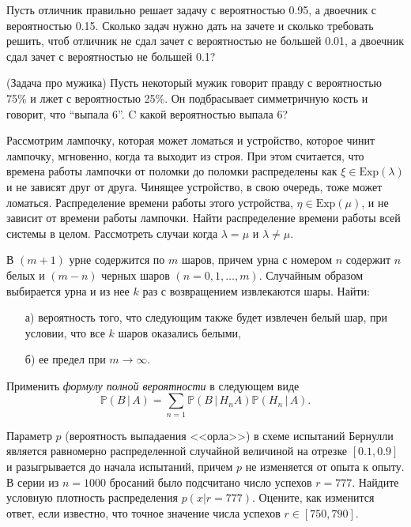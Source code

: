 \begin{problem}
Пусть отличник правильно решает задачу с вероятностью 0.95, а двоечник с вероятностью 0.15. Сколько задач нужно дать на зачете и сколько требовать решить, чтоб отличник не сдал зачет с вероятностью не большей 0.01, а двоечник сдал зачет с вероятностью не большей 0.1?
\end{problem}


\begin{problem}(Задача про мужика)
Пусть некоторый мужик говорит правду с вероятностью 75\% и лжет с 
вероятностью 25\%. Он подбрасывает симметричную кость и говорит, 
что ``выпала 6''. C какой вероятностью выпала 6?
\end{problem}

\begin{problem}
Рассмотрим лампочку, которая может ломаться и устройство, которое чинит лампочку, мгновенно, когда та выходит из строя. При этом считается, что времена работы лампочки от поломки до поломки распределены как $\xi \in \text{Exp}(\lambda)$ и не зависят друг от друга. Чинящее устройство, в свою очередь, тоже может ломаться. Распределение времени работы этого устройства, $\eta \in \text{Exp}(\mu)$, и не зависит от времени работы лампочки. Найти распределение времени работы всей системы в целом. Рассмотреть случаи когда $\lambda = \mu$ и $\lambda \neq \mu$.
\end{problem}



\begin{problem}
В $(m+1)$ урне содержится по $m$ шаров, причем урна с номером $n$ содержит $n$ белых и $(m-n)$ черных шаров $(n = 0,1,\ldots,m)$. 
Случайным образом выбирается урна и из нее $k$ раз с возвращением извлекаются шары. Найти: 
\begin{enumerate}
\item[а)] вероятность того, что следующим также будет извлечен белый шар, при условии, что все $k$ шаров оказались белыми, 
\item[б)] ее предел при $m\to\infty$. 
\end{enumerate}
\end{problem}

\begin{ordre}
Применить \textit{формулу полной вероятности} в следующем виде 
$$
{\mathbb P}(B\, |\, A)=\sum\limits_{n=1} {\mathbb P}(B\, |\, H_n A){\mathbb P}(H_n\, |\, A).
$$
\end{ordre}


\begin{problem}
Параметр $p$ (вероятность выпадаения <<орла>>) в схеме испытаний Бернулли является равномерно распределенной случайной величиной на отрезке $[0.1, 0.9]$ и разыгрывается до начала испытаний, причем $p$ не изменяется от опыта к опыту. В серии из $n=1000$ бросаний было подсчитано число успехов $r=777$.  Найдите условную плотность распределения $p(x|r=777)$. Оцените, как изменится ответ, если известно, что точное значение числа успехов $r\in[750, 790]$.
\end{problem}


